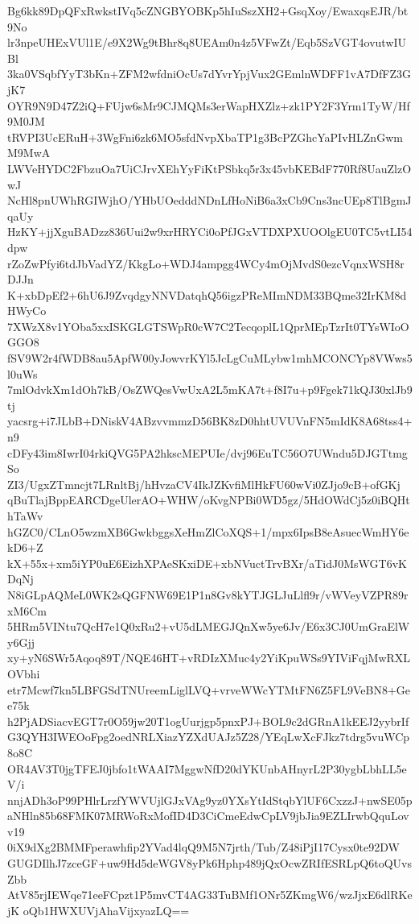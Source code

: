 Bg6kk89DpQFxRwkstIVq5cZNGBYOBKp5hIuSszXH2+GsqXoy/EwaxqsEJR/bt9No
lr3npeUHExVUl1E/e9X2Wg9tBhr8q8UEAm0n4z5VFwZt/Eqb5SzVGT4ovutwIUBl
3ka0VSqbfYyT3bKn+ZFM2wfdniOcUs7dYvrYpjVux2GEmlnWDFF1vA7DfFZ3GjK7
OYR9N9D47Z2iQ+FUjw6sMr9CJMQMs3erWapHXZlz+zk1PY2F3Yrm1TyW/Hf9M0JM
tRVPI3UcERuH+3WgFni6zk6MO5sfdNvpXbaTP1g3BcPZGhcYaPIvHLZnGwmM9MwA
LWVeHYDC2FbzuOa7UiCJrvXEhYyFiKtPSbkq5r3x45vbKEBdF770Rf8UauZlzOwJ
NcHl8pnUWhRGIWjhO/YHbUOedddNDnLfHoNiB6a3xCb9Cns3ncUEp8TlBgmJqaUy
HzKY+jjXguBADzz836Uui2w9xrHRYCi0oPfJGxVTDXPXUOOlgEU0TC5vtLI54dpw
rZoZwPfyi6tdJbVadYZ/KkgLo+WDJ4ampgg4WCy4mOjMvdS0ezcVqnxWSH8rDJJn
K+xbDpEf2+6hU6J9ZvqdgyNNVDatqhQ56igzPReMImNDM33BQme32IrKM8dHWyCo
7XWzX8v1YOba5xxISKGLGTSWpR0cW7C2TecqoplL1QprMEpTzrIt0TYsWIoOGGO8
fSV9W2r4fWDB8au5ApfW00yJowvrKYl5JcLgCuMLybw1mhMCONCYp8VWws5l0uWs
7mlOdvkXm1dOh7kB/OsZWQesVwUxA2L5mKA7t+f8I7u+p9Fgek71kQJ30xlJb9tj
yacsrg+i7JLbB+DNiskV4ABzvvmmzD56BK8zD0hhtUVUVnFN5mIdK8A68tss4+n9
cDFy43im8IwrI04rkiQVG5PA2hkscMEPUIe/dvj96EuTC56O7UWndu5DJGTtmgSo
ZI3/UgxZTmncjt7LRnltBj/hHvzaCV4IkJZKvfiMlHkFU60wVi0ZJjo9cB+ofGKj
qBuTlajBppEARCDgeUlerAO+WHW/oKvgNPBi0WD5gz/5HdOWdCj5z0iBQHthTaWv
hGZC0/CLnO5wzmXB6GwkbggsXeHmZlCoXQS+1/mpx6IpsB8eAsuecWmHY6ekD6+Z
kX+55x+xm5iYP0uE6EizhXPAeSKxiDE+xbNVuctTrvBXr/aTidJ0MsWGT6vKDqNj
N8iGLpAQMeL0WK2sQGFNW69E1P1n8Gv8kYTJGLJuLlfl9r/vWVeyVZPR89rxM6Cm
5HRm5VINtu7QcH7e1Q0xRu2+vU5dLMEGJQnXw5ye6Jv/E6x3CJ0UmGraElWy6Gjj
xy+yN6SWr5Aqoq89T/NQE46HT+vRDIzXMuc4y2YiKpuWSs9YIViFqjMwRXLOVbhi
etr7Mcwf7kn5LBFGSdTNUreemLiglLVQ+vrveWWcYTMtFN6Z5FL9VeBN8+Gee75k
h2PjADSiacvEGT7r0O59jw20T1ogUurjgp5pnxPJ+BOL9c2dGRnA1kEEJ2yybrIf
G3QYH3IWEOoFpg2oedNRLXiazYZXdUAJz5Z28/YEqLwXcFJkz7tdrg5vuWCp8o8C
OR4AV3T0jgTFEJ0jbfo1tWAAI7MggwNfD20dYKUnbAHnyrL2P30ygbLbhLL5eV/i
nnjADh3oP99PHlrLrzfYWVUjlGJxVAg9yz0YXsYtIdStqbYlUF6CxzzJ+nwSE05p
aNHln85b68FMK07MRWoRxMofID4D3CiCmeEdwCpLV9jbJia9EZLIrwbQquLovv19
0iX9dXg2BMMFperawhfip2YVad4lqQ9M5N7jrth/Tub/Z48iPjI17Cysx0te92DW
GUGDIlhJ7zceGF+uw9Hd5deWGV8yPk6Hphp489jQxOcwZRIfESRLpQ6toQUvsZbb
AtV85rjIEWqe71eeFCpzt1P5mvCT4AG33TuBMf1ONr5ZKmgW6/wzJjxE6dlRKejK
oQb1HWXUVjAhaVijxyazLQ==
